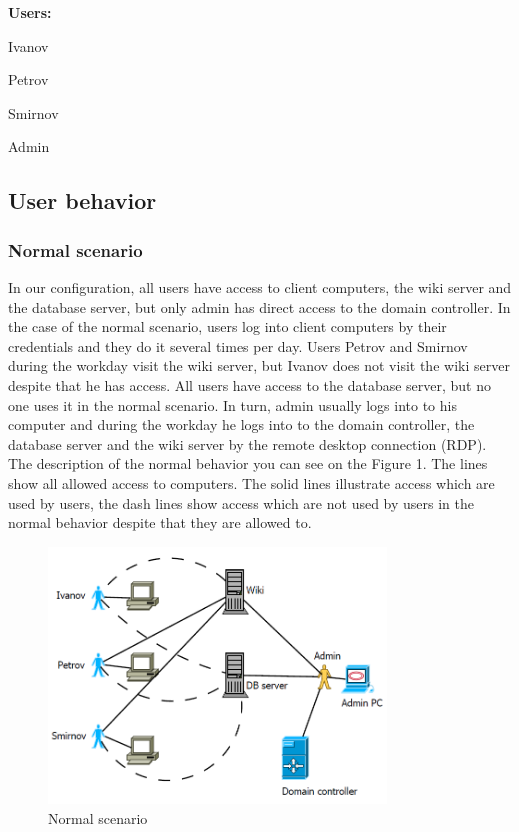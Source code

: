 \begin{compactitem}
\item [\textbf{Users:}]
\item Ivanov
\item Petrov
\item Smirnov
\item Admin
\end{compactitem}
     
     
\subsection{User behavior}
\subsubsection{Normal scenario}
In our configuration, all users have access to client computers, the wiki server and the database server, but only admin has direct access to the domain controller. In the case of the normal scenario, users log into client computers by their credentials and they do it several times per day. Users Petrov and Smirnov during the workday visit the wiki server, but Ivanov does not visit the wiki server despite that he has access. All users have access to the database server, but no one uses it in the normal scenario. In turn, admin usually logs into to his computer and during the workday he logs into to the domain controller, the database server and the wiki server by the remote desktop connection (RDP). The description of the normal behavior you can see on the Figure 1. The lines show all allowed access to computers. The solid lines illustrate access which are used by users, the dash lines show access which are not used by users in the normal behavior despite that they are allowed to. 

\begin{figure}[ht!]
\centering
\includegraphics[width=0.8\textwidth]{scenario_normal.png}
\caption{Normal scenario}
\label{overflow}
\end{figure}


